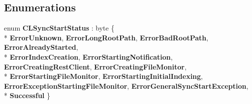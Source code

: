 \subsection*{Enumerations}
\begin{DoxyCompactItemize}
\item 
enum {\bfseries C\-L\-Sync\-Start\-Status} \-: byte \{ \\*
{\bfseries Error\-Unknown}, 
{\bfseries Error\-Long\-Root\-Path}, 
{\bfseries Error\-Bad\-Root\-Path}, 
{\bfseries Error\-Already\-Started}, 
\\*
{\bfseries Error\-Index\-Creation}, 
{\bfseries Error\-Starting\-Notification}, 
{\bfseries Error\-Creating\-Rest\-Client}, 
{\bfseries Error\-Creating\-File\-Monitor}, 
\\*
{\bfseries Error\-Starting\-File\-Monitor}, 
{\bfseries Error\-Starting\-Initial\-Indexing}, 
{\bfseries Error\-Exception\-Starting\-File\-Monitor}, 
{\bfseries Error\-General\-Sync\-Start\-Exception}, 
\\*
{\bfseries Successful}
 \}
\end{DoxyCompactItemize}
